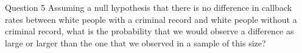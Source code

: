 \documentclass[presentation]{beamer}
\begin{document}
\begin{frame}[label={sec:orgd95c8b3}]{Question 5}
Assuming a null hypothesis that there is no difference in callback rates between white people with a criminal record and white people without a criminal record, what is the probability that we would observe a difference as large or larger than the one that we observed in a sample of this size?
\end{frame}
\end{document}
